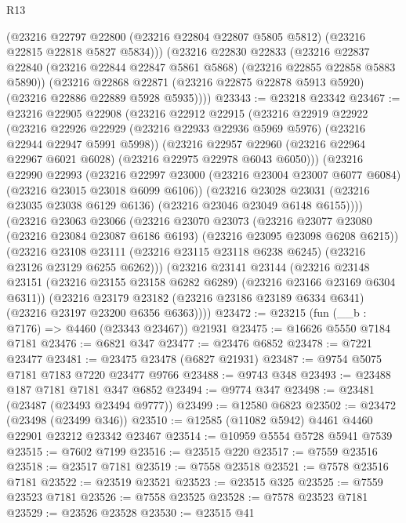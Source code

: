 \begin{lexlean}{R13}
\begin{coremodule}
        (@23216
          @22797
          @22800
          (@23216 @22804 @22807 @5805 @5812)
          (@23216 @22815 @22818 @5827 @5834)))
      (@23216
        @22830
        @22833
        (@23216 @22837 @22840 (@23216 @22844 @22847 @5861 @5868) (@23216 @22855 @22858 @5883 @5890))
        (@23216
          @22868
          @22871
          (@23216 @22875 @22878 @5913 @5920)
          (@23216 @22886 @22889 @5928 @5935))))
@23343 := @23218 @23342
@23467 := @23216
    @22905
    @22908
    (@23216
      @22912
      @22915
      (@23216
        @22919
        @22922
        (@23216 @22926 @22929 (@23216 @22933 @22936 @5969 @5976) (@23216 @22944 @22947 @5991 @5998))
        (@23216
          @22957
          @22960
          (@23216 @22964 @22967 @6021 @6028)
          (@23216 @22975 @22978 @6043 @6050)))
      (@23216
        @22990
        @22993
        (@23216 @22997 @23000 (@23216 @23004 @23007 @6077 @6084) (@23216 @23015 @23018 @6099 @6106))
        (@23216
          @23028
          @23031
          (@23216 @23035 @23038 @6129 @6136)
          (@23216 @23046 @23049 @6148 @6155))))
    (@23216
      @23063
      @23066
      (@23216
        @23070
        @23073
        (@23216 @23077 @23080 (@23216 @23084 @23087 @6186 @6193) (@23216 @23095 @23098 @6208 @6215))
        (@23216
          @23108
          @23111
          (@23216 @23115 @23118 @6238 @6245)
          (@23216 @23126 @23129 @6255 @6262)))
      (@23216
        @23141
        @23144
        (@23216 @23148 @23151 (@23216 @23155 @23158 @6282 @6289) (@23216 @23166 @23169 @6304 @6311))
        (@23216
          @23179
          @23182
          (@23216 @23186 @23189 @6334 @6341)
          (@23216 @23197 @23200 @6356 @6363))))
@23472 := @23215 (fun (__b : @7176) => @4460 (@23343 @23467)) @21931
@23475 := @16626 @5550 @7184 @7181
@23476 := @6821 @347
@23477 := @23476 @6852
@23478 := @7221 @23477
@23481 := @23475 @23478 (@6827 @21931)
@23487 := @9754 @5075 @7181 @7183 @7220 @23477 @9766
@23488 := @9743 @348
@23493 := @23488 @187 @7181 @7181 @347 @6852
@23494 := @9774 @347
@23498 := @23481 (@23487 (@23493 @23494 @9777))
@23499 := @12580 @6823
@23502 := @23472 (@23498 (@23499 @346))
@23510 := @12585 (@11082 @5942) @4461 @4460 @22901 @23212 @23342 @23467
@23514 := @10959 @5554 @5728 @5941 @7539
@23515 := @7602 @7199
@23516 := @23515 @220
@23517 := @7559 @23516
@23518 := @23517 @7181
@23519 := @7558 @23518
@23521 := @7578 @23516 @7181
@23522 := @23519 @23521
@23523 := @23515 @325
@23525 := @7559 @23523 @7181
@23526 := @7558 @23525
@23528 := @7578 @23523 @7181
@23529 := @23526 @23528
@23530 := @23515 @41

\end{coremodule}
\end{lexlean}
